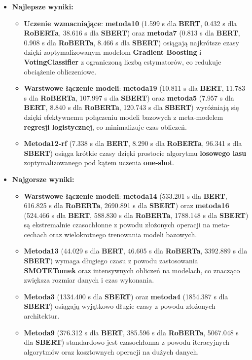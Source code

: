\begin{itemize}
	\item \textbf{Najlepsze wyniki:}
	      \begin{itemize}
		      \item \textbf{Uczenie wzmacniające}: \textbf{metoda10} (1.599 s dla \textbf{BERT}, 0.432 s dla \textbf{RoBERTa}, 38.616 s dla \textbf{SBERT}) oraz \textbf{metoda7} (0.813 s dla \textbf{BERT}, 0.908 s dla \textbf{RoBERTa}, 8.466 s dla \textbf{SBERT}) osiągają najkrótsze czasy dzięki zoptymalizowanym modelom \textbf{Gradient Boosting} i \textbf{VotingClassifier} z ograniczoną liczbą estymatorów, co redukuje obciążenie obliczeniowe.
		      \item \textbf{Warstwowe łączenie modeli}: \textbf{metoda19} (10.811 s dla \textbf{BERT}, 11.783 s dla \textbf{RoBERTa}, 107.997 s dla \textbf{SBERT}) oraz \textbf{metoda5} (7.957 s dla \textbf{BERT}, 8.840 s dla \textbf{RoBERTa}, 120.743 s dla \textbf{SBERT}) wyróżniają się dzięki efektywnemu połączeniu modeli bazowych z meta-modelem \textbf{regresji logistycznej}, co minimalizuje czas obliczeń.
		      \item \textbf{Metoda12-rf} (7.338 s dla \textbf{BERT}, 8.290 s dla \textbf{RoBERTa}, 96.341 s dla \textbf{SBERT}) osiąga krótkie czasy dzięki prostocie algorytmu \textbf{losowego lasu} zoptymalizowanego pod kątem uczenia \textbf{one-shot}.
	      \end{itemize}
	\item \textbf{Najgorsze wyniki:}
	      \begin{itemize}
		      \item \textbf{Warstwowe łączenie modeli}: \textbf{metoda14} (533.201 s dla \textbf{BERT}, 616.825 s dla \textbf{RoBERTa}, 2690.891 s dla \textbf{SBERT}) oraz \textbf{metoda16} (524.466 s dla \textbf{BERT}, 588.830 s dla \textbf{RoBERTa}, 1788.148 s dla \textbf{SBERT}) są ekstremalnie czasochłonne z powodu złożonych operacji na meta-cechach oraz wielokrotnego trenowania modeli bazowych.
		      \item \textbf{Metoda13} (44.029 s dla \textbf{BERT}, 46.605 s dla \textbf{RoBERTa}, 3392.889 s dla \textbf{SBERT}) wymaga długiego czasu z powodu zastosowania \textbf{SMOTETomek} oraz intensywnych obliczeń na modelach, co znacząco zwiększa rozmiar danych i czas wykonania.
		      \item \textbf{Metoda3} (1334.400 s dla \textbf{SBERT}) oraz \textbf{metoda4} (1854.387 s dla \textbf{SBERT}) osiągają wyjątkowo długie czasy z powodu złożonych architektur.
		      \item \textbf{Metoda9} (376.312 s dla \textbf{BERT}, 385.596 s dla \textbf{RoBERTa}, 5067.048 s dla \textbf{SBERT})  standardowo jest czasochłonna z powodu iteracyjnych algorytmów oraz kosztownych operacji na dużych danych.
	      \end{itemize}
\end{itemize}

